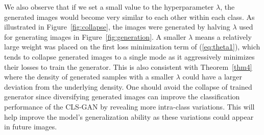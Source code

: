We also observe that if we set a small value to the hyperparameter $\lambda$, the generated images would become very similar to each other within each class. As illustrated in Figure~\ref{fig:collapse}, the images were generated by halving $\lambda$ used for generating images in Figure~\ref{fig:generation}.
A smaller $\lambda$ means a relatively large weight was placed on the first loss minimization term of (\ref{eq:theta1}), which tends to collapse generated images to a single mode as it aggressively minimizes their losses to train the generator. This is also consistent with Theorem~\ref{thm4} where the density of generated samples with a smaller $\lambda$ could have a larger deviation from the underlying density.
One should avoid the collapse of trained generator since
diversifying generated images can improve the classification performance of the CLS-GAN by revealing more intra-class variations.  This will help improve the model's generalization ability as these variations could appear in future images.


